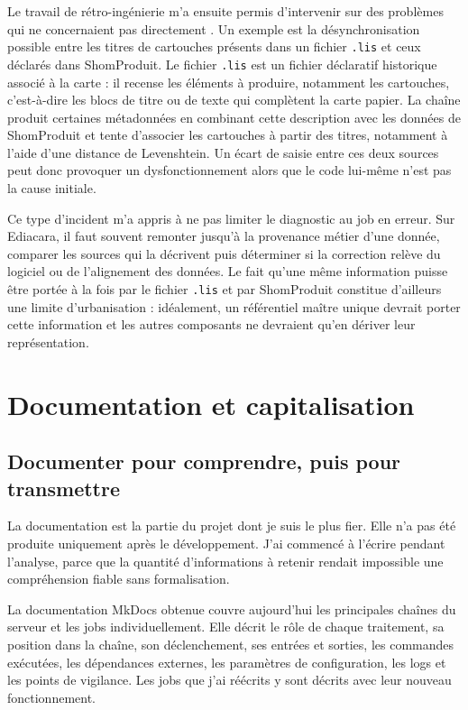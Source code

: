 Le travail de rétro-ingénierie m'a ensuite permis d'intervenir sur des problèmes qui ne concernaient pas directement . Un exemple est la désynchronisation possible entre les titres de cartouches présents dans un fichier \texttt{.lis} et ceux déclarés dans ShomProduit. Le fichier \texttt{.lis} est un fichier déclaratif historique associé à la carte : il recense les éléments à produire, notamment les cartouches, c'est-à-dire les blocs de titre ou de texte qui complètent la carte papier. La chaîne produit certaines métadonnées en combinant cette description avec les données de ShomProduit et tente d'associer les cartouches à partir des titres, notamment à l'aide d'une distance de Levenshtein. Un écart de saisie entre ces deux sources peut donc provoquer un dysfonctionnement alors que le code lui-même n'est pas la cause initiale.

Ce type d'incident m'a appris à ne pas limiter le diagnostic au job en erreur. Sur Ediacara, il faut souvent remonter jusqu'à la provenance métier d'une donnée, comparer les sources qui la décrivent puis déterminer si la correction relève du logiciel ou de l'alignement des données. Le fait qu'une même information puisse être portée à la fois par le fichier \texttt{.lis} et par ShomProduit constitue d'ailleurs une limite d'urbanisation : idéalement, un référentiel maître unique devrait porter cette information et les autres composants ne devraient qu'en dériver leur représentation.

\section{Documentation et capitalisation}

\subsection{Documenter pour comprendre, puis pour transmettre}

La documentation est la partie du projet dont je suis le plus fier. Elle n'a pas été produite uniquement après le développement. J'ai commencé à l'écrire pendant l'analyse, parce que la quantité d'informations à retenir rendait impossible une compréhension fiable sans formalisation.

La documentation MkDocs obtenue couvre aujourd'hui les principales chaînes du serveur et les jobs individuellement. Elle décrit le rôle de chaque traitement, sa position dans la chaîne, son déclenchement, ses entrées et sorties, les commandes exécutées, les dépendances externes, les paramètres de configuration, les logs et les points de vigilance. Les jobs que j'ai réécrits y sont décrits avec leur nouveau fonctionnement.

